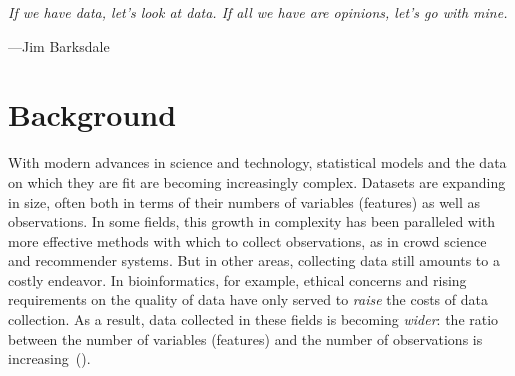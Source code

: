 

\epigraph{\itshape
  If we have data, let’s look at data. If all we have are opinions, let’s go with mine.
}{
  ---Jim Barksdale
}

\section{Background}

With modern advances in science and technology, statistical models and the data on which they are fit are becoming increasingly complex. Datasets are expanding in size, often both in terms of their numbers of variables (features) as well as observations. In some fields, this growth in complexity has been paralleled with more effective methods with which to collect observations, as in crowd science and recommender systems. But in other areas, collecting data still amounts to a costly endeavor. In bioinformatics, for example, ethical concerns and rising requirements on the quality of data have only served to \emph{raise} the costs of data collection. As a result, data collected in these fields is becoming \emph{wider}: the ratio between the number of variables (features) and the number of observations is increasing~().

